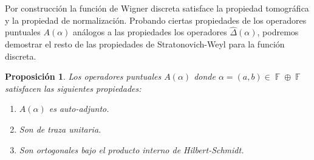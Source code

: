\documentclass[a4paper]{report}
\DeclareMathOperator{\F}{\mathbb{F}}
\newtheorem{proposition}{Proposición}
\begin{document}
  Por construcción la función de Wigner discreta satisface
  la propiedad tomográfica y la propiedad de normalización.
  Probando ciertas propiedades de los operadores puntuales
  $A(\alpha)$ análogos a las propiedades los operadores
  $\hat \Delta(\alpha)$, podremos demostrar el resto de las
  propiedades de Stratonovich-Weyl para la función discreta.
  \begin{proposition}
    \label{prop:point_props}
    Los operadores puntuales $A(\alpha)$ donde $\alpha =
    (a,b) \in \F \oplus \F$ satisfacen las siguientes
    propiedades:
    \begin{enumerate}
      \item $A(\alpha)$ es auto-adjunto.
      \item Son de traza unitaria.
      \item Son ortogonales bajo el producto interno de
        Hilbert-Schmidt.
    \end{enumerate}
  \end{proposition}
\end{document}
